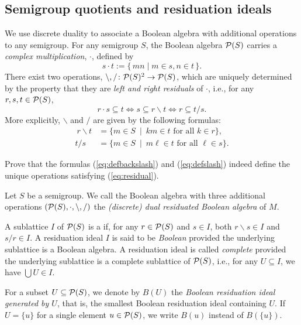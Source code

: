 \subsection*{Semigroup quotients and residuation ideals}

We use discrete duality to associate a Boolean algebra with additional operations to any semigroup. For any semigroup $S$, the Boolean algebra $\mathcal{P}(S)$ carries a \emph{complex multiplication}, $\cdot$, defined by 
\[ s \cdot t := \{\,mn \mid  m \in s, n \in t\,\}.\]
There exist two operations, $\backslash, \slash \colon \mathcal{P}(S)^2 \to \mathcal{P}(S)$, which are uniquely determined by the property that they are \emph{left and right residuals} of $\cdot$, i.e., for any $r, s, t \in \mathcal{P}(S)$, 
\begin{equation}\label{eq:residual} r\cdot s \subseteq t \iff s \subseteq r \backslash t \iff r \subseteq t \slash s.
  \end{equation}
More explicitly, $\backslash$ and $\slash$ are given by the following formulas:
\begin{align}\
 r \backslash t &=\{m \in S \ \mid \ km \in t \text{ for all } k \in r\}, \label{eq:defbackslash}\\
 t \slash s &= \{m \in S \ \mid \ m\ell \in t \text{ for all } \ell \in s\}. \label{eq:defslash}
\end{align}
\begin{exercise}\easy
Prove that the formulas (\ref{eq:defbackslash}) and (\ref{eq:defslash}) indeed define the unique operations satisfying (\ref{eq:residual}).
\end{exercise}

\begin{definition}
Let $S$ be a semigroup. We call the Boolean algebra with three additional operations  $(\mathcal{P}(S), \cdot, \backslash, \slash)$ the \emph{(discrete) dual residuated Boolean algebra} of $M$.

A sublattice $I$ of $\mathcal{P}(S)$ is a  if, for any $r \in \mathcal{P}(S)$ and $s \in I$, both $r \backslash s \in I$ and $s \slash r \in I$. A residuation ideal $I$ is said to be \emph{Boolean} provided the underlying sublattice is a Boolean algebra. A residuation ideal is called \emph{complete} provided the underlying sublattice is a complete sublattice of $\mathcal{P}(S)$, i.e., for any $U \subseteq I$, we have $\bigcup U \in I$.

For a subset $U \subseteq \mathcal{P}(S)$, we denote by $B(U)$ the \emph{Boolean residuation ideal generated by $U$}, that is, the smallest Boolean residuation ideal containing $U$. If $U = \{u\}$ for a single element $u \in \mathcal{P}(S)$, we write $B(u)$ instead of $B(\{u\})$. 
\end{definition}

